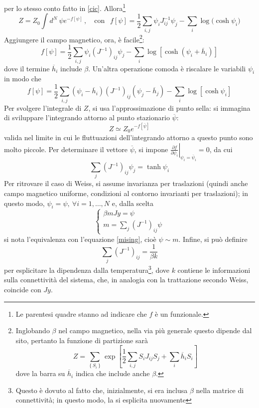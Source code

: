 \documentclass[11pt, a4paper]{scrartcl}
\theoremstyle{style}
\theoremstyle{style1}
\newcommand*\Eval[3]{\left.#1\right\rvert_{#2}^{#3}}
\numberwithin{equation}{subsection}
\begin{document}
per lo stesso conto fatto in \ref{cic}.
Allora\footnote{Le parentesi quadre stanno ad indicare che $f$ \`e un funzionale.}
\[
	Z = Z_0 \int d^N \ \psi e^{-f [\psi ]}\, , \ \ \ \text{ con } \ \ f [\psi ] = \frac{1}{2} \sum_{i,j}^{} \psi _i J^{-1}_{ij}  \psi _j - \sum_{i}^{} \log \big(\cosh \psi _i\big) 
\] 
Aggiungere il campo magnetico, ora, \`e facile\footnote{Inglobando $\beta $ nel campo magnetico, nella via pi\`u generale questo dipende dal sito, pertanto la funzione di partizione sar\`a 
\[
Z = \sum_{\left\{ S_i \right\} }^{} \exp \left[ \frac{1}{2}\sum_{i,j}^{} S_i J_{ij} S_j + \sum_{i}^{} \overline{h}_i S_i \right] 
\] 
dove la barra su $\overline{h}_i$ indica che include anche $\beta $.
}:
\[
	f[\psi ] = \frac{1}{2} \sum_{i,j}^{} \psi _i (J^{-1})_{ij}  \psi _j - \sum_{i}^{} \log \left[ \cosh \left(\psi _i + \overline{h}_i\right)  \right] 
\] 
dove il termine $\overline{h}_i$ include $\beta $.
Un'altra operazione comoda \`e riscalare le variabili $\psi _i$ in modo che 
\[
	f[\psi ] = \frac{1}{2} \sum_{i,j}^{} (\psi_i -\overline{h}_i) (J^{-1})_{ij} (\psi _j - \overline{h}_j) - \sum_{i}^{} \log \left[ \cosh \psi _i \right] 
\] 
Per svolgere l'integrale di $Z$, si usa l'approssimazione di punto sella: si immagina di sviluppare l'integrando attorno al punto stazionario $\overline{\psi }$:
\[
	Z \simeq Z_0 e^{-f [\overline{\psi }]}
\] 
valida nel limite in cui le fluttuazioni dell'integrando attorno a questo punto sono molto piccole.
Per determinare il vettore $\overline{\psi }$, si impone $\Eval{\frac{\partial f}{\partial \psi _i} }{\psi _i = \overline{\psi }_i}{}=0$, da cui
\[
\sum_{j}^{} (J^{-1})_{ij} \psi _j = \tanh \psi _i
\] 
Per ritrovare il caso di Weiss, si assume invarianza per traslazioni (quindi anche campo magnetico uniforme, condizioni al contorno invarianti per traslazioni); in questo modo, $\psi _i = \psi , \ \forall i = 1,\ldots,N$ e, dalla scelta
\[
\begin{cases}
	\beta m J y = \psi \\
	m = \sum_{j}^{} (J^{-1})_{ij} \psi 
\end{cases}
\] 
si nota l'equivalenza con l'equazione \ref{mising}, cio\`e $\psi \sim m$.
Infine, si pu\`o definire 
\[
\sum_{j}^{} (J^{-1}) _{ij}  = \frac{1}{\beta  k}
\] 
per esplicitare la dipendenza dalla temperatura\footnote{Questo \`e dovuto al fatto che, inizialmente, si era inclusa $\beta $ nella matrice di connettivit\`a; in questo modo, la si esplicita nuovamente}, dove $k$ contiene le informazioni sulla connettivit\`a del sistema, che, in analogia con la trattazione secondo Weiss, coincide con $Jy$.
\end{document}
